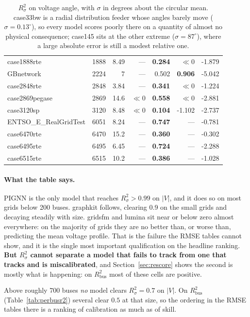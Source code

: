 \documentclass[10pt]{article}
\begin{document}
\begin{table}[H]
\begin{tabular}{lrr rrrr}
case1888rte & 1888 & 8.49 & --- & \textbf{0.284} & $\ll$0 & -1.879 \\
GBnetwork & 2224 & 7 & --- & 0.502 & \textbf{0.906} & -5.042 \\
case2848rte & 2848 & 3.84 & --- & \textbf{0.341} & $\ll$0 & -1.224 \\
case2869pegase & 2869 & 14.6 & $\ll$0 & \textbf{0.558} & $\ll$0 & -2.881 \\
case3120sp & 3120 & 8.48 & $\ll$0 & \textbf{0.104} & -1.102 & -2.737 \\
ENTSO\_E\_RealGridTest & 6051 & 8.24 & --- & \textbf{0.747} & --- & -0.781 \\
case6470rte & 6470 & 15.2 & --- & \textbf{0.360} & --- & -0.302 \\
case6495rte & 6495 & 6.45 & --- & \textbf{0.724} & --- & -2.288 \\
case6515rte & 6515 & 10.2 & --- & \textbf{0.386} & --- & -1.028 \\
\bottomrule
\end{tabular}
\label{tab:r2theta}\caption{$R^2_{\sigma}$ on voltage angle, with $\sigma$ in degrees about the circular mean.
case33bw is a radial distribution feeder whose angles barely move
($\sigma = 0.13^\circ$), so every model scores poorly there on a quantity of
almost no physical consequence; case145 sits at the other extreme
($\sigma = 87^\circ$), where a large absolute error is still a modest relative
one.}
\end{table}

\paragraph{What the table says.} PIGNN is the only model that reaches
$R^2_{\sigma} > 0.99$ on $|V|$, and it does so on most grids below 200 buses. graphkit
follows, clearing 0.9 on the small grids and decaying steadily with size.
gridsfm and lumina sit near or below zero almost everywhere: on the majority of
grids they are no better than, or worse than, predicting the mean voltage
profile. That is the failure the RMSE tables cannot show, and it is the single
most important qualification on the headline ranking.
\textbf{But $R^2_{\sigma}$ cannot separate a model that fails to track from one
that tracks and is miscalibrated}, and Section~\ref{sec:rescore} shows the
second is mostly what is happening: on $R^2_{\mathrm{bus}}$ most of these cells
are positive.

Above roughly 700 buses \emph{no} model clears $R^2_{\sigma} = 0.7$ on $|V|$.
On $R^2_{\mathrm{bus}}$ (Table~\ref{tab:perbusr2}) several clear $0.5$ at that
size, so the ordering in the RMSE tables there is a ranking
of calibration as much as of skill.
\end{document}
